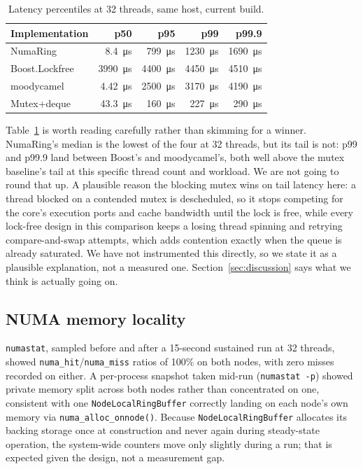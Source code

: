 \documentclass[10pt,journal,compsoc]{IEEEtran}
\begin{document}
\begin{table}[t]
\caption{Latency percentiles at 32 threads, same host, current build.}
\label{tab:tail32}
\centering\small
\begin{tabular}{lrrrr}
\toprule
Implementation & p50 & p95 & p99 & p99.9 \\
\midrule
NumaRing        & \SI{8.4}{\micro\second}   & \SI{799}{\micro\second}  & \SI{1230}{\micro\second} & \SI{1690}{\micro\second} \\
Boost.Lockfree  & \SI{3990}{\micro\second}  & \SI{4400}{\micro\second}  & \SI{4450}{\micro\second} & \SI{4510}{\micro\second} \\
moodycamel      & \SI{4.42}{\micro\second}   & \SI{2500}{\micro\second}  & \SI{3170}{\micro\second} & \SI{4190}{\micro\second} \\
Mutex+deque     & \SI{43.3}{\micro\second}   & \SI{160}{\micro\second}  & \SI{227}{\micro\second} & \SI{290}{\micro\second} \\
\bottomrule
\end{tabular}
\end{table}

Table~\ref{tab:tail32} is worth reading carefully rather than skimming for a winner. NumaRing's
median is the lowest of the four at 32 threads, but its tail is not: p99 and p99.9 land between
Boost's and moodycamel's, both well above the mutex baseline's tail at this specific thread count
and workload. We are not going to round that up. A plausible reason the blocking mutex wins on tail
latency here: a thread blocked on a contended mutex is descheduled, so it stops competing for the
core's execution ports and cache bandwidth until the lock is free, while every lock-free design in
this comparison keeps a losing thread spinning and retrying compare-and-swap attempts, which adds
contention exactly when the queue is already saturated. We have not instrumented this directly, so
we state it as a plausible explanation, not a measured one. Section~\ref{sec:discussion} says what
we think is actually going on.

\subsection{NUMA memory locality}

\texttt{numastat}, sampled before and after a 15-second sustained run at 32 threads, showed
\texttt{numa\_hit}/\texttt{numa\_miss} ratios of 100\% on both nodes, with zero misses recorded on
either. A per-process snapshot taken mid-run (\texttt{numastat -p}) showed private memory split
across both nodes rather than concentrated on one, consistent with one \texttt{NodeLocalRingBuffer}
correctly landing on each node's own memory via \texttt{numa\_alloc\_onnode()}. Because
\texttt{NodeLocalRingBuffer} allocates its backing storage once at construction and never again
during steady-state operation, the system-wide counters move only slightly during a run; that is
expected given the design, not a measurement gap.
\end{document}
